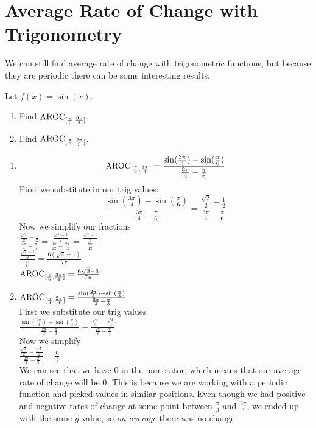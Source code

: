 \documentclass{ximera}
\begin{document}
\section{Average Rate of Change with Trigonometry}

We can still find average rate of change with trigonometric functions, but because they are periodic there can be some interesting results.

\begin{example}
Let $f(x) =\sin(x)$.
\begin{enumerate}
\item Find $\mathrm{AROC}_{[\frac{\pi}{6},\frac{3\pi}{4}]} $.
\item Find $\mathrm{AROC}_{[\frac{\pi}{3},\frac{2\pi}{3}]} $.
\end{enumerate}
\begin{explanation}
\begin{enumerate}
\item $$\mathrm{AROC}_{[\frac{\pi}{6},\frac{3\pi}{4}]}  = \frac{\sin(\frac{3\pi}{4})-\sin(\frac{\pi}{6})}{\frac{3\pi}{4} - \frac{\pi}{6}}$$
First we substitute in our trig values:
$$\frac{\sin(\frac{3\pi}{4})-\sin(\frac{\pi}{6})}{\frac{3\pi}{4} - \frac{\pi}{6}}=\frac{\frac{\sqrt{2}}{2}-\frac{1}{2}}{\frac{3\pi}{4} - \frac{\pi}{6}}$$
Now we simplify our fractions\\
$\frac{\frac{\sqrt{2}}{2}-\frac{1}{2}}{\frac{3\pi}{4} - \frac{\pi}{6}}= \frac{\frac{\sqrt{2}-1}{2}}{\frac{9\pi}{12} - \frac{2\pi}{12}}= \frac{\frac{\sqrt{2}-1}{2}}{\frac{7\pi}{12}}$\\
$\frac{\frac{\sqrt{2}-1}{2}}{\frac{7\pi}{12}}=\frac{6(\sqrt{2}-1)}{7\pi}$\\
$\mathrm{AROC}_{[\frac{\pi}{6},\frac{3\pi}{4}]} =\frac{6\sqrt{2}-6}{7\pi}$

\item $\mathrm{AROC}_{[\frac{\pi}{3},\frac{2\pi}{3}]} = \frac{\sin(\frac{2\pi}{3})-\sin(\frac{\pi}{3})}{\frac{2\pi}{3} - \frac{\pi}{3}}$\\
First we substitute our trig values\\
$\frac{\sin(\frac{2\pi}{3})-\sin(\frac{\pi}{3})}{\frac{2\pi}{3} - \frac{\pi}{3}} = \frac{\frac{\sqrt{3}}{2}-\frac{\sqrt{3}}{2}}{\frac{2\pi}{3} - \frac{\pi}{3}}$\\
Now we simplify\\
$\frac{\frac{\sqrt{3}}{2}-\frac{\sqrt{3}}{2}}{\frac{2\pi}{3} - \frac{\pi}{3}}=\frac{0}{\frac{\pi}{3}}$\\
We can see that we have $0$ in the numerator, which means that our average rate of change will be $0$. This is because we are working with a periodic function and picked values in similar positions. Even though we had positive and negative rates of change at some point between $\frac{\pi}{3}$ and $\frac{2\pi}{3}$, we ended up with the same $y$ value, so \textit{on average} there was no change.
\end{enumerate}
\end{explanation}
\end{example}
\end{document}
